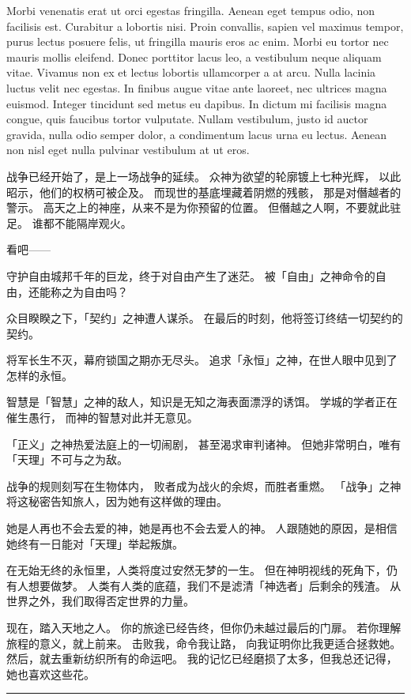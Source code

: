 \documentclass[a4paper,11pt]{article}
\begin{document}
\begin{tcolorbox}[arc=0pt,colback=white,colframe=white,boxsep=0pt,boxrule=0pt,width=\textwidth,height=\textheight-5em,top=0pt,bottom=0pt,left=0pt,right=0pt]
\begin{multicols}{3}
		Morbi venenatis erat ut orci egestas fringilla. Aenean eget tempus odio, non facilisis est. Curabitur a lobortis nisi. Proin convallis, sapien vel maximus tempor, purus lectus posuere felis, ut fringilla mauris eros ac enim. Morbi eu tortor nec mauris mollis eleifend. Donec porttitor lacus leo, a vestibulum neque aliquam vitae. Vivamus non ex et lectus lobortis ullamcorper a at arcu. Nulla lacinia luctus velit nec egestas. In finibus augue vitae ante laoreet, nec ultrices magna euismod. Integer tincidunt sed metus eu dapibus. In dictum mi facilisis magna congue, quis faucibus tortor vulputate. Nullam vestibulum, justo id auctor gravida, nulla odio semper dolor, a condimentum lacus urna eu lectus. Aenean non nisl eget nulla pulvinar vestibulum at ut eros. \par
		战争已经开始了，是上一场战争的延续。
		众神为欲望的轮廓镀上七种光辉，
		以此昭示，他们的权柄可被企及。
		而现世的基底埋藏着阴燃的残骸，
		那是对僭越者的警示。
		高天之上的神座，从来不是为你预留的位置。
		但僭越之人啊，不要就此驻足。
		谁都不能隔岸观火。\par
		看吧——\par
		守护自由城邦千年的巨龙，终于对自由产生了迷茫。
		被「自由」之神命令的自由，还能称之为自由吗？\par
		众目睽睽之下，「契约」之神遭人谋杀。
		在最后的时刻，他将签订终结一切契约的契约。\par
		将军长生不灭，幕府锁国之期亦无尽头。
		追求「永恒」之神，在世人眼中见到了怎样的永恒。\par
		智慧是「智慧」之神的敌人，知识是无知之海表面漂浮的诱饵。
		学城的学者正在催生愚行，
		而神的智慧对此并无意见。\par
		「正义」之神热爱法庭上的一切闹剧，
		甚至渴求审判诸神。
		但她非常明白，唯有「天理」不可与之为敌。\par
		战争的规则刻写在生物体内，
		败者成为战火的余烬，而胜者重燃。
		「战争」之神将这秘密告知旅人，因为她有这样做的理由。\par
		她是人再也不会去爱的神，她是再也不会去爱人的神。
		人跟随她的原因，是相信她终有一日能对「天理」举起叛旗。\par
		在无始无终的永恒里，人类将度过安然无梦的一生。
		但在神明视线的死角下，仍有人想要做梦。
		人类有人类的底蕴，我们不是滤清「神选者」后剩余的残渣。
		从世界之外，我们取得否定世界的力量。\par
		现在，踏入天地之人。
		你的旅途已经告终，但你仍未越过最后的门扉。
		若你理解旅程的意义，就上前来。
		击败我，命令我让路，
		向我证明你比我更适合拯救她。
		然后，就去重新纺织所有的命运吧。
		我的记忆已经磨损了太多，但我总还记得，她也喜欢这些花。\par
        \vspace{12em}\hspace{1pt}
	\end{multicols}
\end{tcolorbox}



\vfill
\rule{\linewidth}{1pt}
\clearpage
\end{document}
